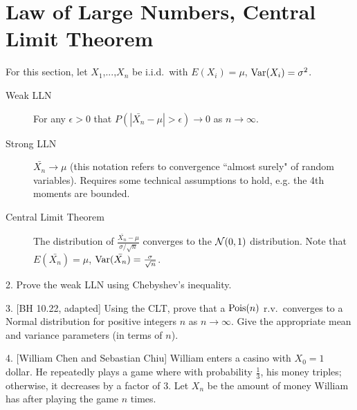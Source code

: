 \documentclass{article}
\begin{document}
\section{Law of Large Numbers, Central Limit Theorem}
For this section, let $X_1$,...,$X_n$ be i.i.d.~with $E(X_i) = \mu$, $\textrm{Var}(X_i) = \sigma^2$.
\begin{description}
\item[Weak LLN] For any $\epsilon>0$ that $P(|\bar{X_n}-\mu| > \epsilon) \rightarrow 0$ as $n \rightarrow \infty$. 

\item[Strong LLN] $\bar{X_n} \rightarrow \mu$ (this notation refers to convergence ``almost surely" of random variables). Requires some technical assumptions to hold, e.g. the 4th moments are bounded.

\item[Central Limit Theorem] The distribution of $\frac{\bar{X_n}-\mu}{\sigma/\sqrt{n}}$ converges to the $\mathcal{N}(0,1)$ distribution. Note that $E(\bar{X_n}) = \mu$, $\textrm{Var}(\bar{X_n}) = \frac{\sigma}{\sqrt{n}}$. 

\end{description}

2. Prove the weak LLN using Chebyshev's inequality.


3. [BH 10.22, adapted] Using the CLT, prove that a $\textrm{Pois}(n)$ r.v.~converges to a Normal distribution for positive integers $n$ as $n \rightarrow \infty$. Give the appropriate mean and variance parameters (in terms of $n$). 


4. [William Chen and Sebastian Chiu] William enters a casino with $X_0=1$ dollar. He repeatedly plays a game where with probability $\frac{1}{3}$, his money triples; otherwise, it decreases by a factor of $3$. Let $X_n$ be the amount of money William has after playing the game $n$ times. 
\end{document}
